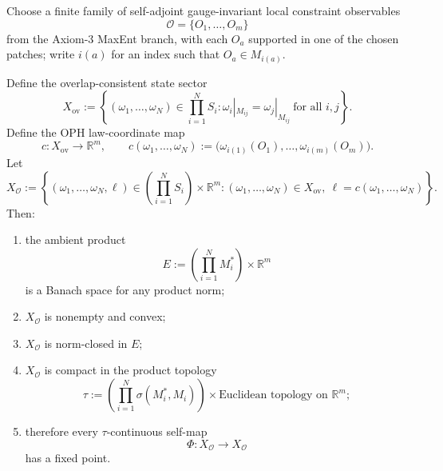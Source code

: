 Choose a finite family of self-adjoint gauge-invariant local constraint observables
\[
\mathcal O=\{O_1,\dots,O_m\}
\]
from the Axiom-3 MaxEnt branch, with each \(O_a\) supported in one of the chosen patches; write
\(i(a)\) for an index such that \(O_a\in M_{i(a)}\).

Define the overlap-consistent state sector
\[
X_{\mathrm{ov}}
:=
\left\{
(\omega_1,\dots,\omega_N)\in \prod_{i=1}^N S_i:
\omega_i|_{M_{ij}}=\omega_j|_{M_{ij}}\ \text{for all }i,j
\right\}.
\]
Define the OPH law-coordinate map
\[
c:X_{\mathrm{ov}}\to \mathbb R^m,
\qquad
c(\omega_1,\dots,\omega_N)
:=
\bigl(\omega_{i(1)}(O_1),\dots,\omega_{i(m)}(O_m)\bigr).
\]
Let
\[
X_{\mathcal O}
:=
\left\{
(\omega_1,\dots,\omega_N,\ell)\in
\left(\prod_{i=1}^N S_i\right)\times \mathbb R^m:
(\omega_1,\dots,\omega_N)\in X_{\mathrm{ov}},
\ \ell=c(\omega_1,\dots,\omega_N)
\right\}.
\]
Then:
\begin{enumerate}
\item the ambient product
\[
E:=
\left(\prod_{i=1}^N M_i^*\right)\times \mathbb R^m
\]
is a Banach space for any product norm;
\item \(X_{\mathcal O}\) is nonempty and convex;
\item \(X_{\mathcal O}\) is norm-closed in \(E\);
\item \(X_{\mathcal O}\) is compact in the product topology
\[
\tau
:=
\left(\prod_{i=1}^N \sigma(M_i^*,M_i)\right)\times
\text{Euclidean topology on }\mathbb R^m;
\]
\item therefore every \(\tau\)-continuous self-map
\[
\Phi:X_{\mathcal O}\to X_{\mathcal O}
\]
has a fixed point.
\end{enumerate}

